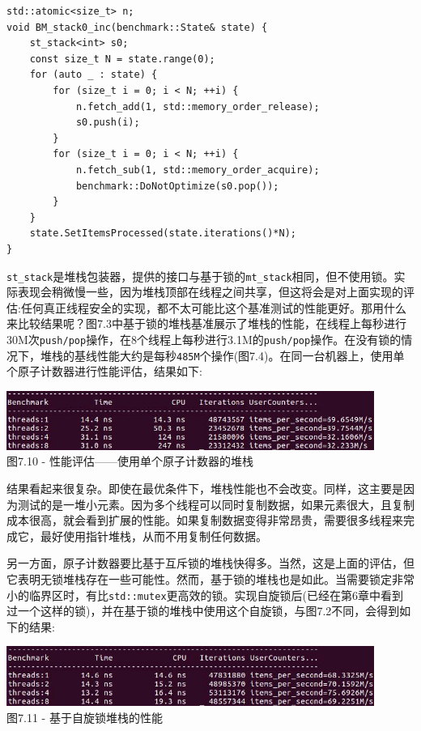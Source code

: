 \begin{lstlisting}[style=styleCXX]
std::atomic<size_t> n;
void BM_stack0_inc(benchmark::State& state) {
	st_stack<int> s0;
	const size_t N = state.range(0);
	for (auto _ : state) {
		for (size_t i = 0; i < N; ++i) {
			n.fetch_add(1, std::memory_order_release);
			s0.push(i);
		}
		for (size_t i = 0; i < N; ++i) {
			n.fetch_sub(1, std::memory_order_acquire);
			benchmark::DoNotOptimize(s0.pop());
		}
	}
	state.SetItemsProcessed(state.iterations()*N);
}
\end{lstlisting}

\texttt{st\_stack}是堆栈包装器，提供的接口与基于锁的\texttt{mt\_stack}相同，但不使用锁。实际表现会稍微慢一些，因为堆栈顶部在线程之间共享，但这将会是对上面实现的评估:任何真正线程安全的实现，都不太可能比这个基准测试的性能更好。那用什么来比较结果呢？图7.3中基于锁的堆栈基准展示了堆栈的性能，在线程上每秒进行30M次\texttt{push/pop}操作，在8个线程上每秒进行3.1M的\texttt{push/pop}操作。在没有锁的情况下，堆栈的基线性能大约是每秒\texttt{485M}个操作(图7.4)。在同一台机器上，使用单个原子计数器进行性能评估，结果如下:

\begin{center}
\includegraphics[width=0.9\textwidth]{content/2/chapter7/images/10.jpg}\\
图7.10 - 性能评估——使用单个原子计数器的堆栈
\end{center}

结果看起来很复杂。即使在最优条件下，堆栈性能也不会改变。同样，这主要是因为测试的是一堆小元素。因为多个线程可以同时复制数据，如果元素很大，且复制成本很高，就会看到扩展的性能。如果复制数据变得非常昂贵，需要很多线程来完成它，最好使用指针堆栈，从而不用复制任何数据。

另一方面，原子计数器要比基于互斥锁的堆栈快得多。当然，这是上面的评估，但它表明无锁堆栈存在一些可能性。然而，基于锁的堆栈也是如此。当需要锁定非常小的临界区时，有比\texttt{std::mutex}更高效的锁。实现自旋锁后(已经在第6章中看到过一个这样的锁)，并在基于锁的堆栈中使用这个自旋锁，与图7.2不同，会得到如下的结果:

\begin{center}
\includegraphics[width=0.9\textwidth]{content/2/chapter7/images/11.jpg}\\
图7.11 - 基于自旋锁堆栈的性能
\end{center}

